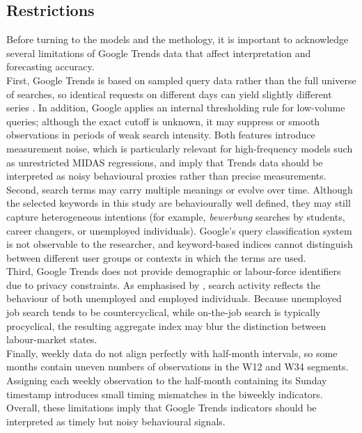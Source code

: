 \documentclass[12pt,a4paper]{article}
\begin{document}
\subsection{Restrictions}
Before turning to the models and the methology, it is important to acknowledge several limitations of Google Trends data that affect interpretation and forecasting accuracy.\\
First, Google Trends is based on sampled query data rather than the full universe of searches, so identical requests on different days can yield slightly different series \citep{carrier}. In addition, Google applies an internal thresholding rule for low-volume queries; although the exact cutoff is unknown, it may suppress or smooth observations in periods of weak search intensity. Both features introduce measurement noise, which is particularly relevant for high-frequency models such as unrestricted MIDAS regressions, and imply that Trends data should be interpreted as noisy behavioural proxies rather than precise measurements.\\
Second, search terms may carry multiple meanings or evolve over time. Although the selected keywords in this study are behaviourally well defined, they may still capture heterogeneous intentions (for example, \textit{bewerbung} searches by students, career changers, or unemployed individuals). Google’s query classification system is not observable to the researcher, and keyword-based indices cannot distinguish between different user groups or contexts in which the terms are used.\\
Third, Google Trends does not provide demographic or labour-force identifiers due to privacy constraints. As emphasised by \citet{D'Amuri2010Google}, search activity reflects the behaviour of both unemployed and employed individuals. Because unemployed job search tends to be countercyclical, while on-the-job search is typically procyclical, the resulting aggregate index may blur the distinction between labour-market states.\\
Finally, weekly data do not align perfectly with half-month intervals, so some months contain uneven numbers of observations in the W12 and W34 segments. Assigning each weekly observation to the half-month containing its Sunday timestamp introduces small timing mismatches in the biweekly indicators.\\
Overall, these limitations imply that Google Trends indicators should be interpreted as timely but noisy behavioural signals. 
\end{document}

